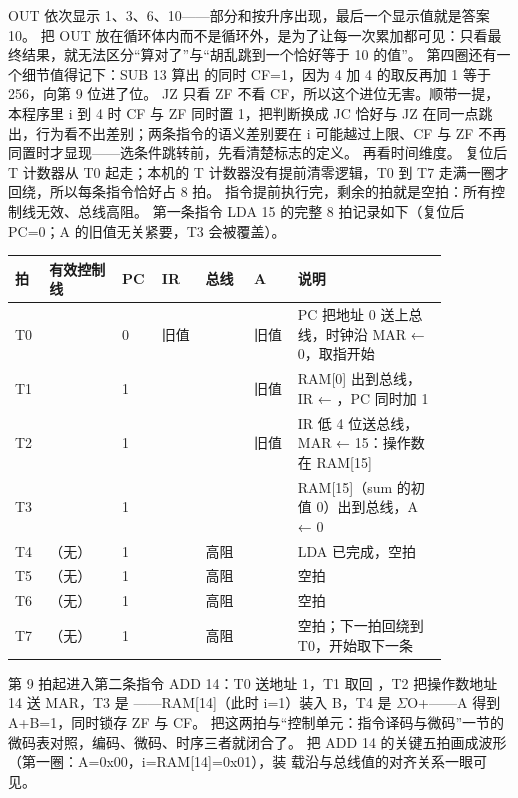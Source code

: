 OUT 依次显示 1、3、6、10——部分和按升序出现，最后一个显示值就是答案 10。
把 OUT 放在循环体内而不是循环外，是为了让每一次累加都可见：只看最终结果，就无法区分“算对了”与“胡乱跳到一个恰好等于 10 的值”。
第四圈还有一个细节值得记下：SUB 13 算出  的同时 CF=1，因为 4 加 4 的取反再加 1 等于 256，向第 9 位进了位。
JZ 只看 ZF 不看 CF，所以这个进位无害。顺带一提，本程序里 i 到 4 时 CF 与 ZF 同时置 1，把判断换成 JC 恰好与 JZ 在同一点跳出，行为看不出差别；两条指令的语义差别要在 i 可能越过上限、CF 与 ZF 不再同置时才显现——选条件跳转前，先看清楚标志的定义。
再看时间维度。
复位后 T 计数器从 T0 起走；本机的 T 计数器没有提前清零逻辑，T0 到 T7 走满一圈才回绕，所以每条指令恰好占 8 拍。
指令提前执行完，剩余的拍就是空拍：所有控制线无效、总线高阻。
第一条指令 LDA 15 的完整 8 拍记录如下（复位后 PC=0；A 的旧值无关紧要，T3 会被覆盖）。

\begin{longtable}{L{0.06\linewidth}L{0.15\linewidth}L{0.06\linewidth}L{0.09\linewidth}L{0.10\linewidth}L{0.09\linewidth}L{0.31\linewidth}}
\toprule
拍 & 有效控制线 & PC & IR & 总线 & A & 说明 \\
\midrule
T0 &  & 0 & 旧值 &  & 旧值 & PC 把地址 0 送上总线，时钟沿 MAR ← 0，取指开始 \\\tablerowrule
T1 &  & 1 &  &  & 旧值 & RAM[0] 出到总线，IR ← ，PC 同时加 1 \\\tablerowrule
T2 &  & 1 &  &  & 旧值 & IR 低 4 位送总线，MAR ← 15：操作数在 RAM[15] \\\tablerowrule
T3 &  & 1 &  &  &  & RAM[15]（sum 的初值 0）出到总线，A ← 0 \\\tablerowrule
T4 & （无） & 1 &  & 高阻 &  & LDA 已完成，空拍 \\\tablerowrule
T5 & （无） & 1 &  & 高阻 &  & 空拍 \\\tablerowrule
T6 & （无） & 1 &  & 高阻 &  & 空拍 \\\tablerowrule
T7 & （无） & 1 &  & 高阻 &  & 空拍；下一拍回绕到 T0，开始取下一条 \\
\bottomrule
\end{longtable}

第 9 拍起进入第二条指令 ADD 14：T0 送地址 1，T1 取回 ，T2 把操作数地址 14 送 MAR，T3 是 ——RAM[14]（此时 i=1）装入 B，T4 是 $\Sigma$O+——A 得到 A+B=1，同时锁存 ZF 与 CF。
把这两拍与“控制单元：指令译码与微码”一节的微码表对照，编码、微码、时序三者就闭合了。
把 ADD 14 的关键五拍画成波形（第一圈：A=0x00，i=RAM[14]=0x01），装
载沿与总线值的对齐关系一眼可见。

